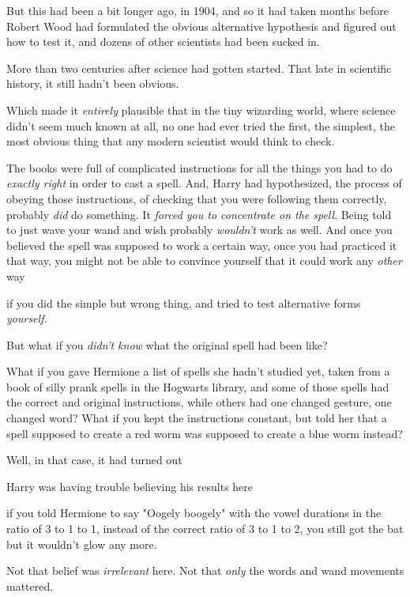 But this had been a bit longer ago, in 1904, and so it had taken months before
Robert Wood had formulated the obvious alternative hypothesis and figured out
how to test it, and dozens of other scientists had been sucked in.

More than two centuries after science had gotten started. That late in
scientific history, it still hadn't been obvious.

Which made it \emph{entirely} plausible that in the tiny wizarding world, where
science didn't seem much known at all, no one had ever tried the first, the
simplest, the most obvious thing that any modern scientist would think to check.

The books were full of complicated instructions for all the things you had to
do \emph{exactly right} in order to cast a spell. And, Harry had hypothesized,
the process of obeying those instructions, of checking that you were following
them correctly, probably \emph{did} do something. It \emph{forced you to
concentrate on the spell}. Being told to just wave your wand and wish probably
\emph{wouldn't} work as well. And once you believed the spell was supposed to
work a certain way, once you had practiced it that way, you might not be able
to convince yourself that it could work any \emph{other} way{\el}

{\el} if you did the simple but wrong thing, and tried to test alternative
forms \emph{yourself.}

But what if you \emph{didn't know} what the original spell had been like?

What if you gave Hermione a list of spells she hadn't studied yet, taken from a
book of silly prank spells in the Hogwarts library, and some of those spells
had the correct and original instructions, while others had one changed
gesture, one changed word? What if you kept the instructions constant, but told
her that a spell supposed to create a red worm was supposed to create a blue
worm instead?

Well, in that case, it had turned out{\el}

{\el} Harry was having trouble believing his results here{\el}

{\el} if you told Hermione to say "Oogely boogely" with the vowel durations
in the ratio of 3 to 1 to 1, instead of the correct ratio of 3 to 1 to 2, you
still got the bat but it wouldn't glow any more.

Not that belief was \emph{irrelevant} here. Not that \emph{only} the words and
wand movements mattered.

